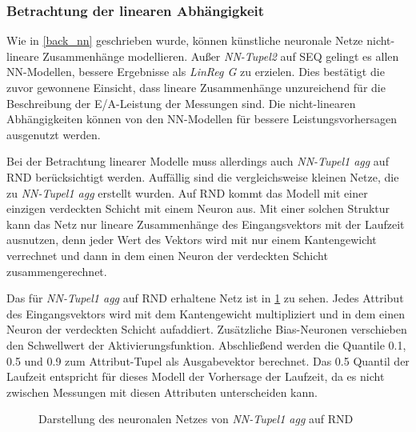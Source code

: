 \documentclass[
	12pt,
	a4paper,
	BCOR10mm,
	DIV14,
	listof=totoc,
	bibliography=totoc,
	headsepline
]{scrreprt}
\begin{document}
\subsubsection{Betrachtung der linearen Abhängigkeit}
Wie in \ref{back_nn} geschrieben wurde, können künstliche neuronale Netze nicht-lineare Zusammenhänge modellieren.
Außer \textit{NN-Tupel2} auf SEQ gelingt es allen NN-Modellen, bessere Ergebnisse als \textit{LinReg G} zu erzielen. Dies bestätigt die zuvor gewonnene Einsicht, dass lineare Zusammenhänge unzureichend für die Beschreibung der E/A-Leistung der Messungen sind.
Die nicht-linearen Abhängigkeiten können von den NN-Modellen für bessere Leistungsvorhersagen ausgenutzt werden.\medskip

Bei der Betrachtung linearer Modelle muss allerdings auch \textit{NN-Tupel1 agg} auf RND berücksichtigt werden.
Auffällig sind die vergleichsweise kleinen Netze, die zu \textit{NN-Tupel1 agg} erstellt wurden.
Auf RND kommt das Modell mit einer einzigen verdeckten Schicht mit einem Neuron aus.
Mit einer solchen Struktur kann das Netz nur lineare Zusammenhänge des Eingangsvektors mit der Laufzeit ausnutzen, denn jeder Wert des Vektors wird mit nur einem Kantengewicht verrechnet und dann in dem einen Neuron der verdeckten Schicht zusammengerechnet.\medskip

Das für \textit{NN-Tupel1 agg} auf RND erhaltene Netz ist in \ref{fig:agg_net} zu sehen.
Jedes Attribut des Eingangsvektors wird mit dem Kantengewicht multipliziert und in dem einen Neuron der verdeckten Schicht aufaddiert. Zusätzliche Bias-Neuronen verschieben den Schwellwert der Aktivierungsfunktion.
Abschließend werden die Quantile 0.1, 0.5 und 0.9 zum Attribut-Tupel als Ausgabevektor berechnet. Das 0.5 Quantil der Laufzeit entspricht für dieses Modell der Vorhersage der Laufzeit, da es nicht zwischen Messungen mit diesen Attributen unterscheiden kann.\medskip

\begin{figure}
	\centering
	\caption{Darstellung des neuronalen Netzes von \textit{NN-Tupel1 agg} auf RND}
	\label{fig:agg_net}
\end{figure} 
\end{document}
